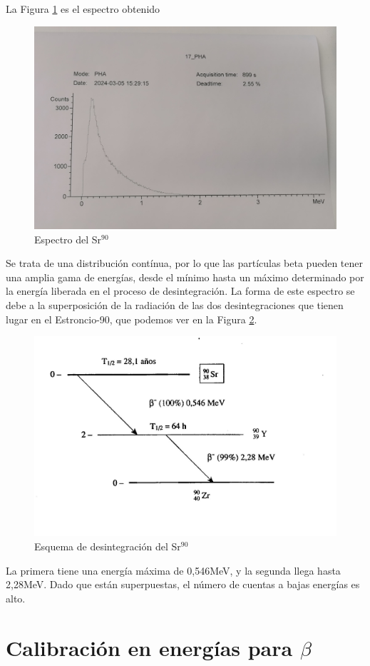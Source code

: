 \documentclass[a4paper,12pt,spanish]{article}
\begin{document}
	La Figura \ref{fig:17} es el espectro obtenido
	
	
\begin{figure}[H]
	\centering
	\includegraphics[width=0.7\linewidth]{"graficas recortadas/17"}
	\caption{Espectro del Sr$^{90}$}
	\label{fig:17}
\end{figure}
	
	Se trata de una distribución contínua, por lo que las partículas beta pueden tener una amplia gama de energías, desde el mínimo hasta un máximo determinado por la energía liberada en el proceso de desintegración.
	La forma de este espectro se debe a la superposición de la radiación de las dos desintegraciones que tienen lugar en el Estroncio-90, que podemos ver en la Figura \ref{fig:desintsr90}. 
	
\begin{figure}[H]
	\centering
	\includegraphics[width=0.7\linewidth]{imagenes/image.C52AM2}
	\caption{Esquema de desintegración del Sr$^{90}$}
	\label{fig:desintsr90}
\end{figure}

	La primera tiene una energía máxima de 0,546MeV, y la segunda llega hasta 2,28MeV. Dado que están superpuestas, el número de cuentas a bajas energías es alto.
	
	


	\section{Calibración en energías para $\beta$}
	
\end{document}
